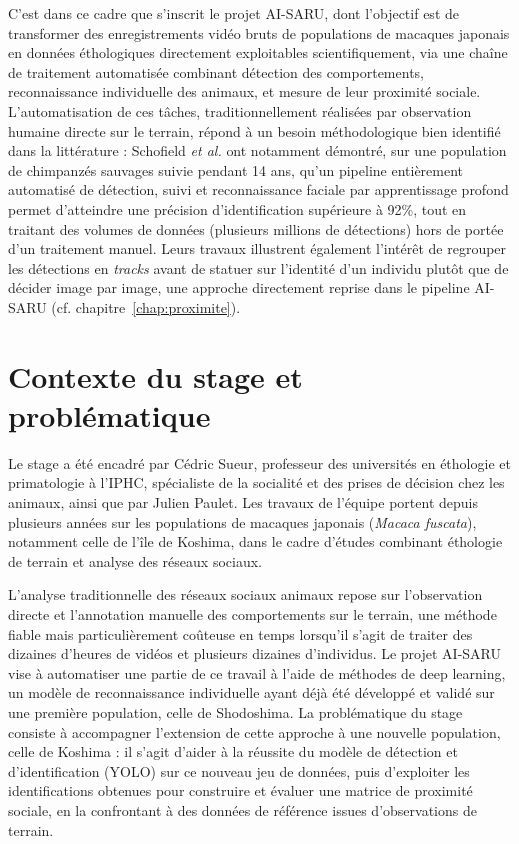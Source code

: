 \documentclass[11pt,a4paper]{report}
\begin{document}
C'est dans ce cadre que s'inscrit le projet AI-SARU, dont l'objectif est de
transformer des enregistrements vidéo bruts de populations de macaques japonais en
données éthologiques directement exploitables scientifiquement, via une chaîne de
traitement automatisée combinant détection des comportements, reconnaissance
individuelle des animaux, et mesure de leur proximité sociale. L'automatisation de
ces tâches, traditionnellement réalisées par observation humaine directe sur le
terrain, répond à un besoin méthodologique bien identifié dans la littérature :
Schofield \emph{et al.} \citep{schofield2019} ont notamment démontré, sur une
population de chimpanzés sauvages suivie pendant 14 ans, qu'un pipeline entièrement
automatisé de détection, suivi et reconnaissance faciale par apprentissage profond
permet d'atteindre une précision d'identification supérieure à 92\%, tout en
traitant des volumes de données (plusieurs millions de détections) hors de portée
d'un traitement manuel. Leurs travaux illustrent également l'intérêt de regrouper
les détections en \emph{tracks} avant de statuer sur l'identité d'un individu plutôt
que de décider image par image, une approche directement reprise dans le pipeline
AI-SARU (cf. chapitre~\ref{chap:proximite}).


\section*{Contexte du stage et problématique}

Le stage a été encadré par Cédric Sueur, professeur des universités en
éthologie et primatologie à l'IPHC, spécialiste de la socialité et des
prises de décision chez les animaux, ainsi que par Julien Paulet. Les
travaux de l'équipe portent depuis plusieurs années sur les populations de
macaques japonais (\emph{Macaca fuscata}), notamment celle de l'île de
Koshima, dans le cadre d'études combinant éthologie de terrain et analyse
des réseaux sociaux.

L'analyse traditionnelle des réseaux sociaux animaux repose sur
l'observation directe et l'annotation manuelle des comportements sur le
terrain, une méthode fiable mais particulièrement coûteuse en temps
lorsqu'il s'agit de traiter des dizaines d'heures de vidéos et plusieurs
dizaines d'individus. Le projet AI-SARU vise à automatiser une partie de ce
travail à l'aide de méthodes de deep learning, un modèle de reconnaissance
individuelle ayant déjà été développé et validé sur une première
population, celle de Shodoshima. La problématique du stage consiste à
accompagner l'extension de cette approche à une nouvelle population, celle
de Koshima : il s'agit d'aider à la réussite du modèle de détection et
d'identification (YOLO) sur ce nouveau jeu de données, puis d'exploiter les
identifications obtenues pour construire et évaluer une matrice de
proximité sociale, en la confrontant à des données de référence issues
d'observations de terrain.
\end{document}
